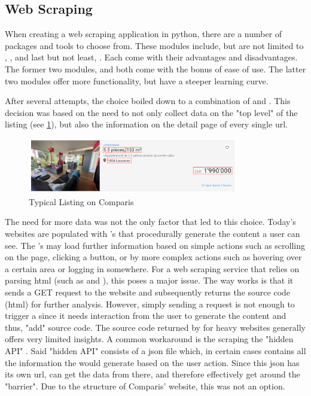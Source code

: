 \documentclass[main]{subfiles}
\begin{document}
\subsection{Web Scraping}

When creating a web scraping application in python, there are a number of packages and tools to choose from.
These modules include, but are not limited to \pkg[requests], \pkg[BeautifulSoup], \pkg[Scrapy] and last but not least, \pkg[Selenium].
Each come with their advantages and disadvantages. 
The former two modules, \pkg[requests] and \pkg[BeautifulSoup] both come with the bonus of ease of use.
The latter two modules offer more functionality, but have a steeper learning curve.

After several attempts, the choice boiled down to a combination of \pkg[Selenium] and \pkg[Scrapy].
This decision was based on the need to not only collect data on the "top level" of the listing (see \ref{fig:listing}), 
but also the information on the detail page of every single \acs*{url}.

\begin{figure}[htbp]
    \centerline{
        \includegraphics[width = 92mm]{prog_1.png}}
    \caption{Typical Listing on Comparis}
    \label{fig:listing}
\end{figure}

The need for more data was not the only factor that led to this choice.
Today's websites are populated with \js's that procedurally generate the content a user can see.
The \js's may load further information based on simple actions such as scrolling on the page,
clicking a button, or by more complex actions such as hovering over a certain area or logging in somewhere.
For a web scraping service that relies on parsing \acs*{html} (such as \pkg[requests] and \pkg[BeautifulSoup]), 
this poses a major issue.
The way \pkg[requests] works is that it sends a GET request to the website and subsequently returns the source code (\acs*{html}) for further analysis.
However, simply sending a request is not enough to trigger a \js since it needs interaction from the user to generate the content and thus, 
"add" source code.
The source code returned by \pkg[requests] for \js heavy websites generally offers very limited insights.
A common workaround is the scraping the "hidden API" \hly[cite].
Said "hidden API" consists of a \acs*{json} file which, in certain cases contains all the information the \js would generate based on the user action.
Since this  \acs*{json} has its own \acs*{url}, \pkg[requests] can get the data from there, 
and therefore effectively get around the "\js barrier".
Due to the structure of Comparis' website, this was not an option.
\end{document}
